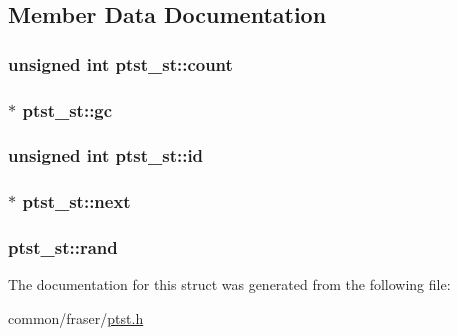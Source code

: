 \subsection{Member Data Documentation}
\hypertarget{structptst__st_aef54caaf3df5ccda6bc73784579e1c9a}{
\subsubsection[{count}]{\setlength{\rightskip}{0pt plus 5cm}unsigned int ptst\-\_\-st\-::count}}\label{structptst__st_aef54caaf3df5ccda6bc73784579e1c9a}
\hypertarget{structptst__st_a7754d5a3a9ef62a128fdfb068e3d7328}{
\subsubsection[{gc}]{$\ast$ ptst\-\_\-st\-::gc}}\label{structptst__st_a7754d5a3a9ef62a128fdfb068e3d7328}
\hypertarget{structptst__st_af174fa81aa64e606612795b7b1dc83e7}{
\subsubsection[{id}]{\setlength{\rightskip}{0pt plus 5cm}unsigned int ptst\-\_\-st\-::id}}\label{structptst__st_af174fa81aa64e606612795b7b1dc83e7}
\hypertarget{structptst__st_a77d37efa51f5e5a298a2add3bac557ef}{
\subsubsection[{next}]{$\ast$ ptst\-\_\-st\-::next}}\label{structptst__st_a77d37efa51f5e5a298a2add3bac557ef}
\hypertarget{structptst__st_a0d0c7772d66ae84cb1304f9defd32dfe}{
\subsubsection[{rand}]{ ptst\-\_\-st\-::rand}}\label{structptst__st_a0d0c7772d66ae84cb1304f9defd32dfe}


The documentation for this struct was generated from the following file\-:\begin{DoxyCompactItemize}
\item 
common/fraser/\hyperlink{ptst_8h}{ptst.\-h}\end{DoxyCompactItemize}

